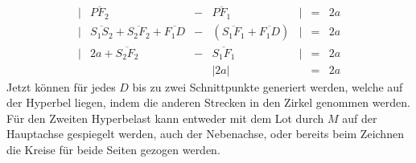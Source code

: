 \begin{displaymath}
	\begin{array}{lcccrcl}
		|&\overline{{PF}_2} & - & \overline{{PF}_1}&| & = & 2a\\
		|&\overline{{S}_1{S}_2}+\overline{{S}_2{F}_2}+\overline{{F}_1{D}} & - & (\overline{{S}_1{F}_1}+\overline{{F}_1{D}})&| & = & 2a\\
		|&2a+\overline{{S}_2{F}_2} & - & \overline{{S}_1{F}_1}&| & = & 2a\\
		&&&|2a| && = & 2a
	\end{array}
\end{displaymath}
Jetzt können für jedes $D$ bis zu zwei Schnittpunkte generiert werden, welche auf der Hyperbel liegen, indem die anderen Strecken in den Zirkel genommen werden. Für den Zweiten Hyperbelast kann entweder mit dem Lot durch $M$ auf der Hauptachse gespiegelt werden, auch der Nebenachse, oder bereits beim Zeichnen die Kreise für beide Seiten gezogen werden.\\